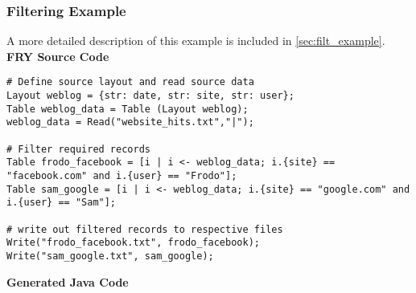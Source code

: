 \documentclass{article}
\begin{document}
\subsubsection{Filtering Example}
A more detailed description of this example is included in \ref{sec:filt_example}.
\textbf{FRY Source Code}
\begin{lstlisting}
# Define source layout and read source data
Layout weblog = {str: date, str: site, str: user};
Table weblog_data = Table (Layout weblog);
weblog_data = Read("website_hits.txt","|");

# Filter required records
Table frodo_facebook = [i | i <- weblog_data; i.{site} == "facebook.com" and i.{user} == "Frodo"];
Table sam_google = [i | i <- weblog_data; i.{site} == "google.com" and i.{user} == "Sam"];

# write out filtered records to respective files
Write("frodo_facebook.txt", frodo_facebook);
Write("sam_google.txt", sam_google);
\end{lstlisting}
\vspace{5 mm}
\textbf{Generated Java Code}
\end{document}
